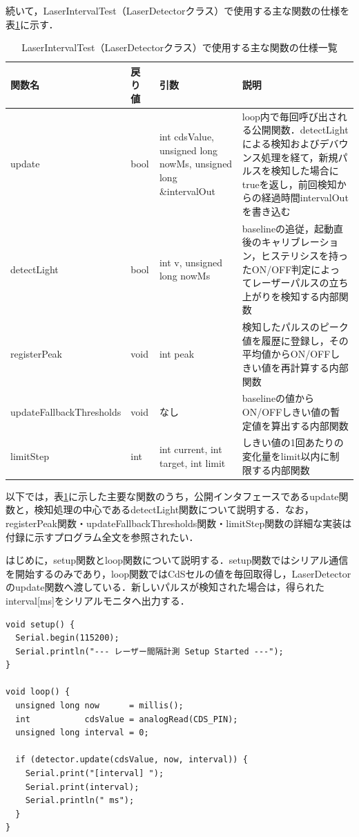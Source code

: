 続いて，LaserIntervalTest（LaserDetectorクラス）で使用する主な関数の仕様を表\ref{table:laser_func}に示す．

\begin{table}[H]
    \caption{LaserIntervalTest（LaserDetectorクラス）で使用する主な関数の仕様一覧}
    \centering
    \label{table:laser_func}
    \begin{tabular}{p{5.2cm}p{1.3cm}p{3.3cm}p{3.3cm}}
    \hline
    \textbf{関数名} & \textbf{戻り値} & \textbf{引数} & \textbf{説明}\\
    \hline
    update & bool & int cdsValue, unsigned long nowMs, unsigned long \&intervalOut & loop内で毎回呼び出される公開関数．detectLightによる検知およびデバウンス処理を経て，新規パルスを検知した場合にtrueを返し，前回検知からの経過時間intervalOutを書き込む\\
    \hline
    detectLight & bool & int v, unsigned long nowMs & baselineの追従，起動直後のキャリブレーション，ヒステリシスを持ったON/OFF判定によってレーザーパルスの立ち上がりを検知する内部関数\\
    \hline
    registerPeak & void & int peak & 検知したパルスのピーク値を履歴に登録し，その平均値からON/OFFしきい値を再計算する内部関数\\
    \hline
    updateFallbackThresholds & void & なし & baselineの値からON/OFFしきい値の暫定値を算出する内部関数\\
    \hline
    limitStep & int & int current, int target, int limit & しきい値の1回あたりの変化量をlimit以内に制限する内部関数\\
    \hline
    \end{tabular}
\end{table}

\fi

\iffalse
以下では，表\ref{table:laser_func}に示した主要な関数のうち，公開インタフェースであるupdate関数と，検知処理の中心であるdetectLight関数について説明する．なお，registerPeak関数・updateFallbackThresholds関数・limitStep関数の詳細な実装は付録に示すプログラム全文を参照されたい．

はじめに，setup関数とloop関数について説明する．setup関数ではシリアル通信を開始するのみであり，loop関数ではCdSセルの値を毎回取得し，LaserDetectorのupdate関数へ渡している．新しいパルスが検知された場合は，得られたinterval[ms]をシリアルモニタへ出力する．

\begin{lstlisting}[caption={LaserIntervalTest.inoのsetup関数・loop関数}, label={lst:laser_setuploop}]
void setup() {
  Serial.begin(115200);
  Serial.println("--- レーザー間隔計測 Setup Started ---");
}

void loop() {
  unsigned long now      = millis();
  int           cdsValue = analogRead(CDS_PIN);
  unsigned long interval = 0;

  if (detector.update(cdsValue, now, interval)) {
    Serial.print("[interval] ");
    Serial.print(interval);
    Serial.println(" ms");
  }
}
\end{lstlisting}

